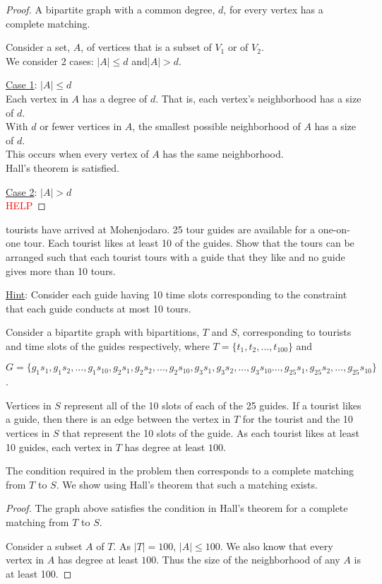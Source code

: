 \documentclass[a4paper]{exam}
\begin{document}
\begin{questions}
\begin{solution}
    \begin{proof} A bipartite graph with a common degree, $d$, for every vertex has a complete matching.

      Consider a set, $A$, of vertices that is a subset of $V_1$ or of $V_2$.\\
      We consider 2 cases: $|A|\le d$ and$|A|> d$.

      \underline{Case 1}: $|A| \le d$\\
      Each vertex in $A$ has a degree of $d$. That is, each vertex's neighborhood has a size of $d$.\\
      With $d$ or fewer vertices in $A$, the smallest possible neighborhood of $A$ has a size of $d$.\\
      This occurs when every vertex of $A$ has the same neighborhood.\\
      Hall's theorem is satisfied.

      \underline{Case 2}: $|A| > d$\\
      \textcolor{red}{HELP}
      
    \end{proof}
  \end{solution}

   tourists have arrived at Mohenjodaro. 25 tour guides are available for a one-on-one tour. Each tourist likes at least 10 of the guides. Show that the tours can be arranged such that each tourist tours with a guide that they like and no guide gives more than 10 tours.

  \underline{Hint}: Consider each guide having 10 time slots corresponding to the constraint that each guide conducts at most 10 tours.
  \begin{solution}
    Consider a bipartite graph with bipartitions, $T$ and $S$, corresponding to tourists and time slots of the guides respectively, where $T=\{t_1,t_2,\ldots,t_{100}\}$ and
    
{\small
  $G=\{g_1s_1, g_1s_2,\ldots, g_1s_{10},g_2s_1, g_2s_2,\ldots, g_2s_{10},g_3s_1, g_3s_2,\ldots, g_3s_{10}\ldots,g_{25}s_1, g_{25}s_2,\ldots, g_{25}s_{10}\}$.
}

Vertices in $S$ represent all of the 10 slots of each of the 25 guides. If a tourist likes a guide, then there is an edge between the vertex in $T$ for the tourist and the 10 vertices in $S$ that represent the 10 slots of the guide. As each tourist likes at least 10 guides, each vertex in $T$ has degree at least $100$.

The condition required in the problem then corresponds to a complete matching from $T$ to $S$. We show using Hall's theorem that such a matching exists.

\begin{proof} The graph above satisfies the condition in Hall's theorem for a complete matching from $T$ to $S$.
  
Consider a subset $A$ of $T$. As $|T|=100$, $|A|\le 100$. We also know that every vertex in $A$ has degree at least $100$. Thus the size of the neighborhood of any $A$ is at least 100.
\end{proof}
\end{solution}

\end{questions}
\end{document}
